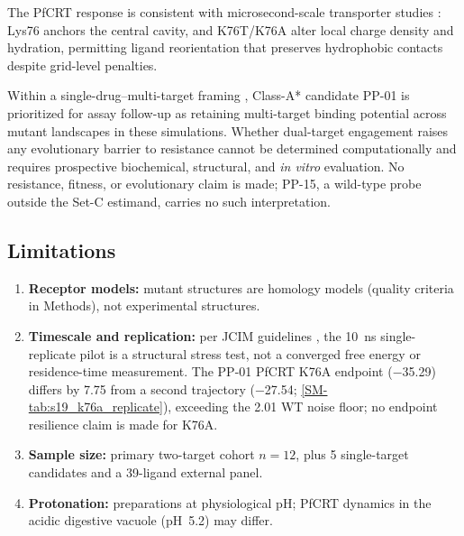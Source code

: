 \documentclass[journal=jcisd8,manuscript=article,layout=traditional]{achemso}
\begin{document}
The PfCRT response is consistent with microsecond-scale transporter studies \citep{tanner2025pfcrt}: Lys76 anchors the central cavity, and K76T/K76A alter local charge density and hydration, permitting ligand reorientation that preserves hydrophobic contacts despite grid-level penalties.

Within a single-drug--multi-target framing \citep{polypharmacology_malaria_2026}, Class-A* candidate PP-01 is prioritized for assay follow-up as retaining multi-target binding potential across mutant landscapes in these simulations. Whether dual-target engagement raises any evolutionary barrier to resistance cannot be determined computationally and requires prospective biochemical, structural, and \textit{in vitro} evaluation. No resistance, fitness, or evolutionary claim is made; PP-15, a wild-type probe outside the Set-C estimand, carries no such interpretation.

\subsection{Limitations}

\begin{enumerate}
    \item \textbf{Receptor models:} mutant structures are homology models (quality criteria in Methods), not experimental structures.
    \item \textbf{Timescale and replication:} per JCIM guidelines \citep{soares2023mdreport}, the \qty{10}{\ns} single-replicate pilot is a structural stress test, not a converged free energy or residence-time measurement. The PP-01 PfCRT K76A endpoint (\qty{-35.29}{\kcalmol}) differs by \qty{7.75}{\kcalmol} from a second trajectory (\qty{-27.54}{\kcalmol}; \cref{SM-tab:s19_k76a_replicate}), exceeding the \qty{2.01}{\kcalmol} WT noise floor; no endpoint resilience claim is made for K76A.
    \item \textbf{Sample size:} primary two-target cohort $n=\num{12}$, plus 5 single-target candidates and a 39-ligand external panel.
    \item \textbf{Protonation:} preparations at physiological pH; PfCRT dynamics in the acidic digestive vacuole (pH~\num{5.2}) may differ.
\end{enumerate}

\end{document}
